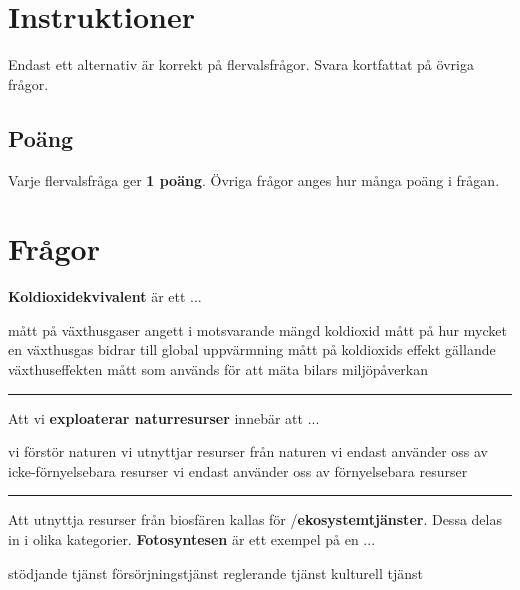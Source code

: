 \documentclass{exam}
\begin{document}
\section*{Instruktioner}
Endast ett alternativ är korrekt på flervalsfrågor. Svara kortfattat på övriga frågor.

\subsection*{Poäng}
Varje flervalsfråga ger \textbf{1 poäng}. Övriga frågor anges hur många poäng i frågan.

\section*{Frågor}

\begin{questions}

\question \textbf{Koldioxidekvivalent} är ett ... 
\vspace{2mm}
\begin{checkboxes}
    \choice mått på växthusgaser angett i motsvarande mängd koldioxid
    \choice mått på hur mycket en växthusgas bidrar till global uppvärmning
    \choice mått på koldioxids effekt gällande växthuseffekten
    \choice mått som används för att mäta bilars miljöpåverkan
\end{checkboxes}

\vspace{5mm} 
\hrule 
\vspace{5mm} 

\question Att vi \textbf{exploaterar naturresurser} innebär att ... 
\vspace{2mm}
\begin{checkboxes}
    \choice vi förstör naturen
    \choice vi utnyttjar resurser från naturen
    \choice vi endast använder oss av icke-förnyelsebara resurser
    \choice vi endast använder oss av förnyelsebara resurser
\end{checkboxes}

\vspace{5mm} 
\hrule 
\vspace{5mm} 

\question Att utnyttja resurser från biosfären kallas för /\textbf{ekosystemtjänster}. Dessa delas in i olika kategorier. \textbf{Fotosyntesen} är ett exempel på en ...
\vspace{2mm}
\begin{checkboxes}
    \choice stödjande tjänst
    \choice försörjningstjänst
    \choice reglerande tjänst
    \choice kulturell tjänst
\end{checkboxes}


\end{questions}
\end{document}
